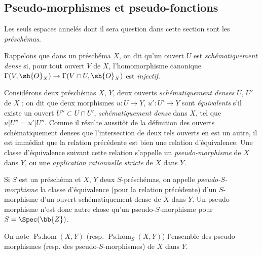 \subsection{Pseudo-morphismes et pseudo-fonctions}

Les seuls espaces annelés dont il sera question dans cette section sont les \emph{préschémas}.

\begin{env}[20.2.1]
Rappelons  que dans un préschéma $X$, on dit qu'un ouvert $U$ est \emph{schématiquement dense} si, pour tout ouvert $V$ de $X$, l'homomorphisme canonique $\Gamma(V,\sh{O}_X)\to\Gamma(V\cap U,\sh{O}_X)$ est \emph{injectif}.

Considérons deux préschémas $X$, $Y$, deux ouverts \emph{schématiquement denses} $U$, $U'$ de $X$ ; on dit que deux morphismes $u:U\to Y$, $u':U'\to Y$ sont \emph{équivalents} s'il existe un ouvert $U''\subset U\cap U'$, \emph{schématiquement dense} dans $X$, tel que $u|U''=u'|U''$.
Comme il résulte aussitôt de la définition des ouverts schématiquement denses que l'intersection de deux tels ouverts en est un autre, il est immédiat que la relation précédente est bien une relation d'équivalence.
Une classe d'équivalence suivant cette relation s'appelle un \emph{pseudo-morphisme} de $X$ dans $Y$, ou une \emph{application rationnelle stricte} de $X$ dans $Y$.

Si $S$ est un préschéma et $X$, $Y$ deux $S$-préschémas, on appelle \emph{pseudo-$S$-morphisme} la classe d'équivalence (pour la relation précédente) d'un $S$-morphisme d'un ouvert schématiquement dense de $X$ dans $Y$.
Un pseudo-morphisme n'est donc autre chose qu'un pseudo-$S$-morphisme pour $S=\Spec(\bb{Z})$.

On note $\operatorname{Ps.hom}(X,Y)$ (resp. $\operatorname{Ps.hom}_S(X,Y)$) l'ensemble des pseudo-morphismes (resp. des pseudo-$S$-morphismes) de $X$ dans $Y$.
\end{env}

